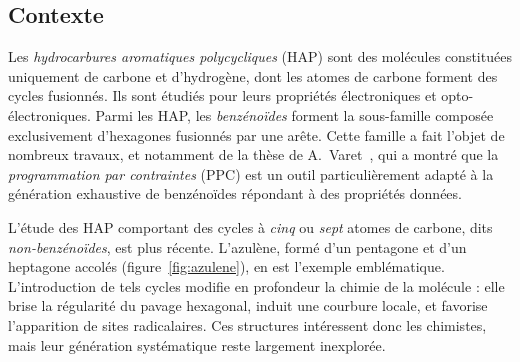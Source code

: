 \documentclass[11pt,a4paper]{article}
\begin{document}
\subsection{Contexte}

Les \emph{hydrocarbures aromatiques polycycliques} (HAP) sont des molécules
constituées uniquement de carbone et d'hydrogène, dont les atomes de carbone
forment des cycles fusionnés. Ils sont étudiés pour leurs propriétés
électroniques et opto-électroniques. Parmi les HAP, les \emph{benzénoïdes}
forment la sous-famille composée exclusivement d'hexagones fusionnés par une
arête. Cette famille a fait l'objet de nombreux travaux, et notamment de la
thèse de A.~Varet~\cite{varet2022}, qui a montré que la \emph{programmation
par contraintes} (PPC) est un outil particulièrement adapté à la génération
exhaustive de benzénoïdes répondant à des propriétés données.

L'étude des HAP comportant des cycles à \emph{cinq} ou \emph{sept} atomes de carbone,
dits \emph{non-benzénoïdes}, est plus récente. L'azulène, formé d'un
pentagone et d'un heptagone accolés (figure~\ref{fig:azulene}), en est
l'exemple emblématique. L'introduction de tels cycles modifie en profondeur
la chimie de la molécule : elle brise la régularité du pavage hexagonal,
induit une courbure locale, et favorise l'apparition de sites radicalaires.
Ces structures intéressent donc les chimistes, mais leur génération
systématique reste largement inexplorée.
\end{document}

